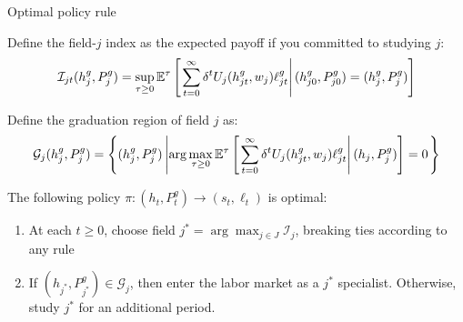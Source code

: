 \begin{frame}{Optimal policy rule}\label{model_optimal_rule}

Define the field-$j$ index as the expected payoff if you committed to studying $j$:
\begin{equation*}
\mathcal{I}_{jt} (h_{j}^g, P_{j}^g) = \sup_{\tau \geq 0} \mathbb{E}^\tau
\left[\left. 
   \sum_{t=0}^\infty \delta^t 
   U_j(h_{jt}^g, w_j) \ell_{jt}^g
 \right\vert 
    (h_{j0}^g, P_{j0}^g) = (h_{j}^g, P_{j}^g)
 \right]
\end{equation*}

Define the graduation region of field $j$ as: 
\begin{equation*}
\mathcal{G}_j (h_{j}^g, P_{j}^g)  = 
    \left\{
        (h_{j}^g, P_{j}^g) 
        \left\vert
            \arg \max_{\tau \geq 0} 
            \mathbb{E}^\tau 
            \left[\left. 
                \sum_{t=0}^\infty \delta^t 
                U_j(h_{jt}^g, w_j) \ell_{jt}^g
             \right\vert 
                (h_j, P_j^g)
             \right] = 0
   \right. \right\}
\end{equation*}

The following policy $\pi: (h_t, P_t^g) \to (s_t, \ell_t)$ is optimal: 
\begin{enumerate}
    \item At each $t \geq 0$, choose field $j^* = \arg \max_{j \in J} \mathcal{I}_j$, breaking ties according to any rule
    \item If $(h_{j^*}, P_{j^*}^g) \in \mathcal{G}_{j}$, then enter the labor market as a $j^*$ specialist. Otherwise, study $j^*$ for an additional period.  
\end{enumerate}

\hyperlink{likelihood}{}

\end{frame}



